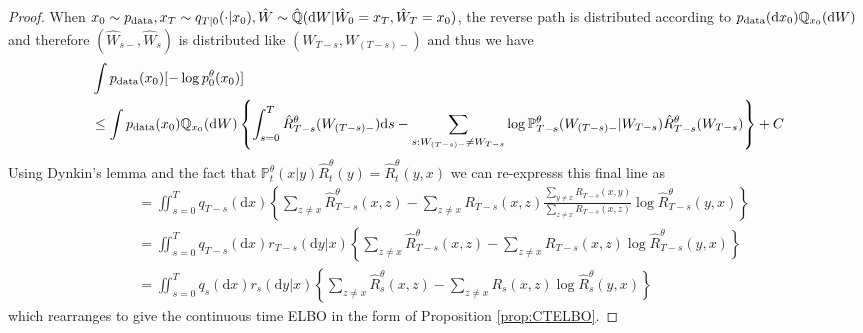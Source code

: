 \documentclass{article}
\newcommand{\rd}{\mathrm{d}}
\begin{document}
\begin{proof}
When $x_0\sim \pdata, x_T \sim q_{T|0}(\cdot | x_0), \hat{W} \sim  \hat{\mathbb{Q}}( \rd W| \hat{W}_0=x_T, \hat{W}_T=x_0)$, 
the reverse path is distributed according to $\pdata(\rd x_0) \mathbb{Q}_{x_0}( \rd W)$ and therefore 
$(\hat{W}_{s-}, \hat{W}_s)$ is distributed like $(W_{T-s}, W_{(T-s)-})$
and thus we have
\begin{align}
&\int \pdata(x_0)[ -\log p_0^\theta (x_0)]\\
&\leq \int \pdata(x_0) \mathbb{Q}_{x_0}(\rd W)
\left\{
\int_{s=0}^T \hat{R}_{T-s}^\theta({W}_{(T-s)-}) \rd s -
\sum_{s: {W}_{(T-s)-}\neq {W}_{T-s}} 
\log \mathbb{P}^{\theta}_{T-s}({W}_{(T-s)-} | {W}_{T-s}) \hat R_{T-s}^{\theta}({W}_{T-s})
\right\} + C\\
\end{align}    
Using Dynkin's lemma and the fact that 
$\mathbb{P}_t^\theta(x|y) \hat{R}_t^{\theta}(y) 
=\hat{R}_t^{\theta}(y,x)$ we can re-expresss this final line as
\begin{align}
&= \iint_{s=0}^T q_{T-s}(\rd x) 
\left\{\sum_{z\neq x} \hat{R}_{T-s}^\theta (x, z) 
- \sum_{z\neq x} {R}_{T-s}(x,z) \frac{\sum_{y\neq x}{R}_{T-s}(x,y) }{\sum_{z\neq x} {R}_{T-s}(x,z)} \log \hat{R}_{T-s}^\theta (y,x) \right\}\\
&=\iint_{s=0}^T q_{T-s}(\rd x)r_{T-s}(\rd y| x) 
\left\{\sum_{z\neq x} \hat{R}_{T-s}^\theta (x, z) 
- \sum_{z\neq x} {R}_{T-s}(x,z)  \log \hat{R}_{T-s}^\theta (y,x) \right\}\\
&=\iint_{s=0}^T q_{s}(\rd x)r_{s}(\rd y| x) 
\left\{\sum_{z\neq x} \hat{R}_{s}^\theta (x, z) 
- \sum_{z\neq x} {R}_{s}(x,z)  \log \hat{R}_{s}^\theta (y,x) \right\}
\end{align}
which rearranges to give the continuous time ELBO in the form of Proposition \ref{prop:CTELBO}.

\end{proof}
\end{document}
